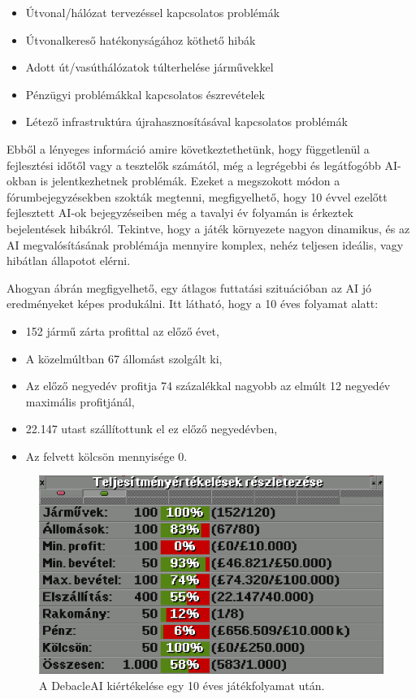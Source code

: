 \begin{itemize}
	\item Útvonal/hálózat tervezéssel kapcsolatos problémák
	\item Útvonalkereső hatékonyságához köthető hibák
	\item Adott út/vasúthálózatok túlterhelése járművekkel
	\item Pénzügyi problémákkal kapcsolatos észrevételek
	\item Létező infrastruktúra újrahasznosításával kapcsolatos problémák
\end{itemize}

Ebből a lényeges információ amire következtethetünk, hogy függetlenül a fejlesztési időtől vagy a tesztelők számától, még a legrégebbi és legátfogóbb AI-okban is jelentkezhetnek problémák. Ezeket a megszokott módon a fórumbejegyzésekben szokták megtenni, megfigyelhető, hogy 10 évvel ezelőtt fejlesztett AI-ok bejegyzéseiben még a tavalyi év folyamán is érkeztek bejelentések hibákról. Tekintve, hogy a játék környezete nagyon dinamikus, és az AI megvalósításának problémája mennyire komplex, nehéz teljesen ideális, vagy hibátlan állapotot elérni.

Ahogyan  ábrán megfigyelhető, egy átlagos futtatási szituációban az AI jó eredményeket képes produkálni. Itt látható, hogy a 10 éves folyamat alatt:

\begin{itemize}
	\item 152 jármű zárta profittal az előző évet,
	\item A közelmúltban 67 állomást szolgált ki,
	\item Az előző negyedév profitja 74 százalékkal nagyobb az elmúlt 12 negyedév maximális profitjánál,
	\item 22.147 utast szállítottunk el ez előző negyedévben,
	\item Az felvett kölcsön mennyisége 0.
\end{itemize}

\begin{figure}
	\centering
	\includegraphics[width=\textwidth]{images/atlag.png}
	\caption{A DebacleAI kiértékelése egy 10 éves játékfolyamat után.}
	\label{fig:atlag}
\end{figure}

